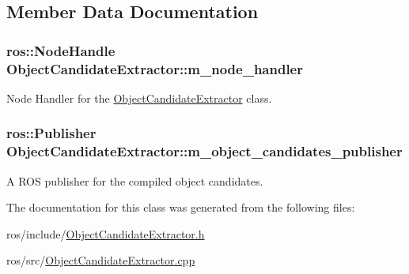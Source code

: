 \subsection{\-Member \-Data \-Documentation}
\hypertarget{class_object_candidate_extractor_a9a0da45687232f96360f76175a3cb097}{
\subsubsection[{m\-\_\-node\-\_\-handler}]{\setlength{\rightskip}{0pt plus 5cm}ros\-::\-Node\-Handle {\bf \-Object\-Candidate\-Extractor\-::m\-\_\-node\-\_\-handler}}}\label{class_object_candidate_extractor_a9a0da45687232f96360f76175a3cb097}


\-Node \-Handler for the \hyperlink{class_object_candidate_extractor}{\-Object\-Candidate\-Extractor} class. 

\hypertarget{class_object_candidate_extractor_a3b5cd0451266eafe0aba2d950a7434e8}{
\subsubsection[{m\-\_\-object\-\_\-candidates\-\_\-publisher}]{\setlength{\rightskip}{0pt plus 5cm}ros\-::\-Publisher {\bf \-Object\-Candidate\-Extractor\-::m\-\_\-object\-\_\-candidates\-\_\-publisher}}}\label{class_object_candidate_extractor_a3b5cd0451266eafe0aba2d950a7434e8}


\-A \-R\-O\-S publisher for the compiled object candidates. 



\-The documentation for this class was generated from the following files\-:\begin{DoxyCompactItemize}
\item 
ros/include/\hyperlink{_object_candidate_extractor_8h}{\-Object\-Candidate\-Extractor.\-h}\item 
ros/src/\hyperlink{_object_candidate_extractor_8cpp}{\-Object\-Candidate\-Extractor.\-cpp}\end{DoxyCompactItemize}
